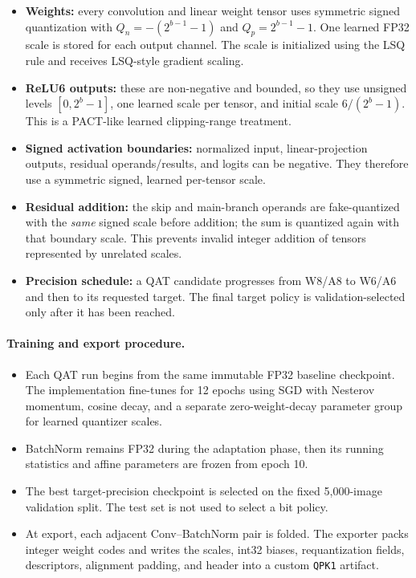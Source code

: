 \begin{itemize}
    \item \textbf{Weights:} every convolution and linear weight tensor uses
    symmetric signed quantization with
    $Q_n=-(2^{b-1}-1)$ and $Q_p=2^{b-1}-1$. One learned FP32 scale is stored
    for each output channel. The scale is initialized using the LSQ rule and
    receives LSQ-style gradient scaling.
    \item \textbf{ReLU6 outputs:} these are non-negative and bounded, so they
    use unsigned levels $[0,2^b-1]$, one learned scale per tensor, and initial
    scale $6/(2^b-1)$. This is a PACT-like learned clipping-range treatment.
    \item \textbf{Signed activation boundaries:} normalized input,
    linear-projection outputs, residual operands/results, and logits can be
    negative. They therefore use a symmetric signed, learned per-tensor scale.
    \item \textbf{Residual addition:} the skip and main-branch operands are
    fake-quantized with the \emph{same} signed scale before addition; the sum
    is quantized again with that boundary scale. This prevents invalid integer
    addition of tensors represented by unrelated scales.
    \item \textbf{Precision schedule:} a QAT candidate progresses from W8/A8
    to W6/A6 and then to its requested target. The final target policy is
    validation-selected only after it has been reached.
\end{itemize}

\paragraph{Training and export procedure.}

\begin{itemize}
    \item Each QAT run begins from the same immutable FP32 baseline checkpoint.
    The implementation fine-tunes for 12 epochs using SGD with Nesterov
    momentum, cosine decay, and a separate zero-weight-decay parameter group
    for learned quantizer scales.
    \item BatchNorm remains FP32 during the adaptation phase, then its running
    statistics and affine parameters are frozen from epoch 10.
    \item The best target-precision checkpoint is selected on the fixed
    5,000-image validation split. The test set is not used to select a bit
    policy.
    \item At export, each adjacent Conv--BatchNorm pair is folded. The
    exporter packs integer weight codes and writes the scales, int32 biases,
    requantization fields, descriptors, alignment padding, and header into a
    custom \texttt{QPK1} artifact.
\end{itemize}

